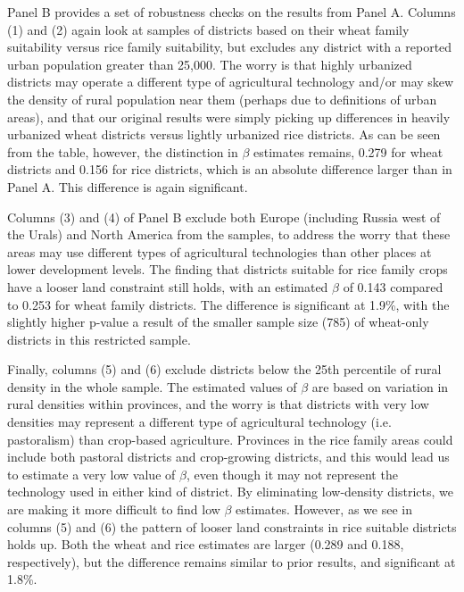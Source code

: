 \documentclass[11pt]{article}
\begin{document}
Panel B provides a set of robustness checks on the results from Panel A. Columns (1) and (2) again look at samples of districts based on their wheat family suitability versus rice family suitability, but excludes any district with a reported urban population greater than 25,000. The worry is that highly urbanized districts may operate a different type of agricultural technology and/or may skew the density of rural population near them (perhaps due to definitions of urban areas), and that our original results were simply picking up differences in heavily urbanized wheat districts versus lightly urbanized rice districts. As can be seen from the table, however, the distinction in $\beta$ estimates remains, 0.279 for wheat districts and 0.156 for rice districts, which is an absolute difference larger than in Panel A. This difference is again significant.

Columns (3) and (4) of Panel B exclude both Europe (including Russia west of the Urals) and North America from the samples, to address the worry that these areas may use different types of agricultural technologies than other places at lower development levels. The finding that districts suitable for rice family crops have a looser land constraint still holds, with an estimated $\beta$ of 0.143 compared to 0.253 for wheat family districts. The difference is significant at 1.9\%, with the slightly higher p-value a result of the smaller sample size (785) of wheat-only districts in this restricted sample.

Finally, columns (5) and (6) exclude districts below the 25th percentile of rural density in the whole sample. The estimated values of $\beta$ are based on variation in rural densities within provinces, and the worry is that districts with very low densities may represent a different type of agricultural technology (i.e. pastoralism) than crop-based agriculture. Provinces in the rice family areas could include both pastoral districts and crop-growing districts, and this would lead us to estimate a very low value of $\beta$, even though it may not represent the technology used in either kind of district. By eliminating low-density districts, we are making it more difficult to find low $\beta$ estimates. However, as we see in columns (5) and (6) the pattern of looser land constraints in rice suitable districts holds up. Both the wheat and rice estimates are larger (0.289 and 0.188, respectively), but the difference remains similar to prior results, and significant at 1.8\%.
\end{document}
